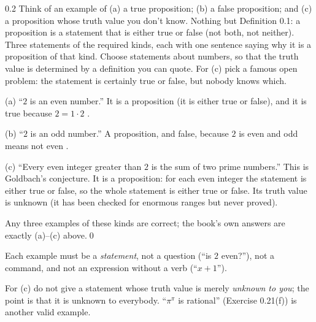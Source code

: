 \begin{bookex}[essential]{0.2}
Think of an example of (a) a true proposition; (b) a false proposition; and (c) a proposition whose truth value you don't know.
\solution
\given Nothing but Definition 0.1: a proposition is a statement that is either true or false (not both, not neither).
\goal Three statements of the required kinds, each with one sentence saying why it is a proposition of that kind.
\plan Choose statements about numbers, so that the truth value is determined by a definition you can quote. For (c) pick a famous open problem: the statement is certainly true or false, but nobody knows which.
\begin{steps}
\item (a) ``$2$ is an even number.'' It is a proposition (it is either true or false), and it is true because $2=1\cdot2$ .
\item (b) ``$2$ is an odd number.'' A proposition, and false, because $2$ is even and odd means not even .
\item (c) ``Every even integer greater than $2$ is the sum of two prime numbers.'' This is Goldbach's conjecture. It is a proposition: for each even integer the statement is either true or false, so the whole statement is either true or false. Its truth value is unknown (it has been checked for enormous ranges but never proved).
\end{steps}
\conclusion Any three examples of these kinds are correct; the book's own answers are exactly (a)--(c) above.\qed
\begin{compare}
\item Each example must be a \emph{statement}, not a question (``is $2$ even?''), not a command, and not an expression without a verb (``$x+1$'').
\item For (c) do not give a statement whose truth value is merely \emph{unknown to you}; the point is that it is unknown to everybody. ``$\pi^\pi$ is rational'' (Exercise 0.21(f)) is another valid example.
\end{compare}
\end{bookex}

